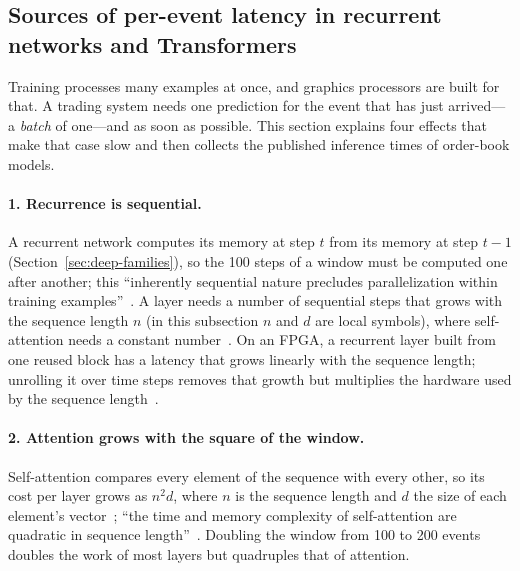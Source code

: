 \subsection{Sources of per-event latency in recurrent networks and Transformers}
\label{sec:hw-why}

Training processes many examples at once, and graphics processors are built for that. A trading system needs one
prediction for the event that has just arrived---a \emph{batch} of one---and as soon as possible. This section
explains four effects that make that case slow and then collects the published inference times of order-book
models.

\paragraph{1. Recurrence is sequential.} A recurrent network computes its memory at step $t$ from its memory at step
$t-1$ (Section~\ref{sec:deep-families}), so the 100 steps of a window must be computed one after another; this
``inherently sequential nature precludes parallelization within training examples''~\citep{vaswani2017}. A layer needs
a number of sequential steps that grows with the sequence length $n$ (in this subsection $n$ and $d$ are local
symbols), where self-attention needs a constant
number~\citep{vaswani2017}. On an FPGA, a recurrent layer built from one reused block has a latency that grows linearly
with the sequence length; unrolling it over time steps removes that growth but multiplies the hardware used by the
sequence length~\citep{khoda2023rnn}.

\paragraph{2. Attention grows with the square of the window.} Self-attention compares every element of the sequence
with every other, so its cost per layer grows as $n^2 d$, where $n$ is the sequence length and $d$ the size of each
element's vector~\citep{vaswani2017}; ``the time and memory complexity of self-attention are quadratic in sequence
length''~\citep{dao2022flashattention}. Doubling the window from 100 to 200 events doubles the work of most layers but
quadruples that of attention.

